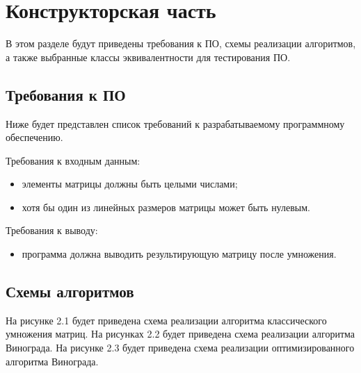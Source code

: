 \chapter{Конструкторская часть}
В этом разделе будут приведены требования к ПО, схемы реализации алгоритмов,
а также выбранные классы эквивалентности для тестирования ПО.

\section{Требования к ПО}
Ниже будет представлен список требований к разрабатываемому программному обеспечению. 

Требования к входным данным: 
\begin{itemize}
	\item элементы матрицы должны быть целыми числами;
	\item хотя бы один из линейных размеров матрицы может быть нулевым.
\end{itemize}

Требования к выводу: 
\begin{itemize}
	\item программа должна выводить результирующую матрицу после умножения.
\end{itemize}

\section{Схемы алгоритмов}
На рисунке 2.1 будет приведена схема реализации алгоритма классического умножения матриц.
На рисунках 2.2 будет приведена схема реализации алгоритма Винограда.
На рисунке 2.3 будет приведена схема реализации оптимизированного алгоритма Винограда.

